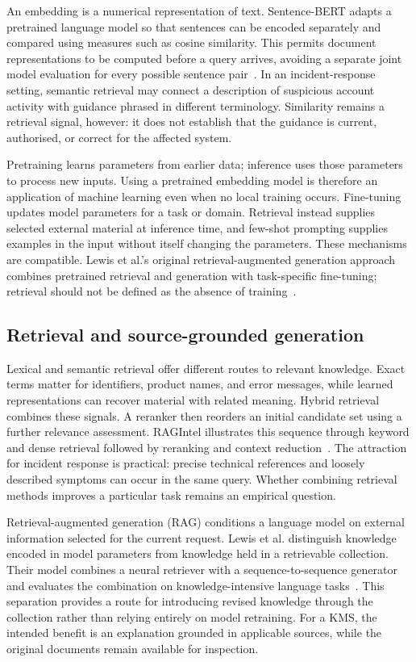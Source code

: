 An embedding is a numerical representation of text. Sentence-BERT adapts a pretrained language model so that sentences can be encoded separately and compared using measures such as cosine similarity. This permits document representations to be computed before a query arrives, avoiding a separate joint model evaluation for every possible sentence pair~\cite{reimers2019sentencebert}. In an incident-response setting, semantic retrieval may connect a description of suspicious account activity with guidance phrased in different terminology. Similarity remains a retrieval signal, however: it does not establish that the guidance is current, authorised, or correct for the affected system.

Pretraining learns parameters from earlier data; inference uses those parameters to process new inputs. Using a pretrained embedding model is therefore an application of machine learning even when no local training occurs. Fine-tuning updates model parameters for a task or domain. Retrieval instead supplies selected external material at inference time, and few-shot prompting supplies examples in the input without itself changing the parameters. These mechanisms are compatible. Lewis et al.'s original retrieval-augmented generation approach combines pretrained retrieval and generation with task-specific fine-tuning; retrieval should not be defined as the absence of training~\cite{lewis2020rag}.

\subsection{Retrieval and source-grounded generation}
Lexical and semantic retrieval offer different routes to relevant knowledge. Exact terms matter for identifiers, product names, and error messages, while learned representations can recover material with related meaning. Hybrid retrieval combines these signals. A reranker then reorders an initial candidate set using a further relevance assessment. RAGIntel illustrates this sequence through keyword and dense retrieval followed by reranking and context reduction~\cite{ref033}. The attraction for incident response is practical: precise technical references and loosely described symptoms can occur in the same query. Whether combining retrieval methods improves a particular task remains an empirical question.

Retrieval-augmented generation (RAG) conditions a language model on external information selected for the current request. Lewis et al. distinguish knowledge encoded in model parameters from knowledge held in a retrievable collection. Their model combines a neural retriever with a sequence-to-sequence generator and evaluates the combination on knowledge-intensive language tasks~\cite{lewis2020rag}. This separation provides a route for introducing revised knowledge through the collection rather than relying entirely on model retraining. For a KMS, the intended benefit is an explanation grounded in applicable sources, while the original documents remain available for inspection.

